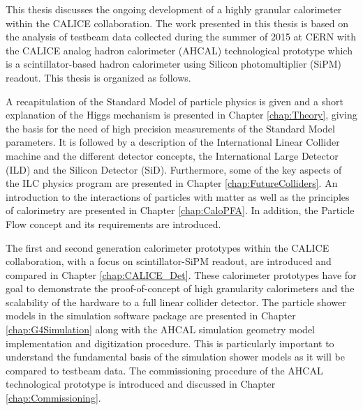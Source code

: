 This thesis discusses the ongoing development of a highly granular calorimeter within the CALICE collaboration. The work presented in this thesis is based on the analysis of testbeam data collected during the summer of 2015 at CERN with the CALICE analog hadron calorimeter (AHCAL) technological prototype which is a scintillator-based hadron calorimeter using Silicon photomultiplier (SiPM) readout. This thesis is organized as follows.

A recapitulation of the Standard Model of particle physics is given and a short explanation of the Higgs mechanism is presented in Chapter \ref{chap:Theory}, giving the basis for the need of high precision measurements of the Standard Model parameters. It is followed by a description of the International Linear Collider machine and the different detector concepts, the International Large Detector (ILD) and the Silicon Detector (SiD). Furthermore, some of the key aspects of the ILC physics program are presented in Chapter \ref{chap:FutureColliders}. An introduction to the interactions of particles with matter as well as the principles of calorimetry are presented in Chapter \ref{chap:CaloPFA}. In addition, the Particle Flow concept and its requirements are introduced.

The first and second generation calorimeter prototypes within the CALICE collaboration, with a focus on scintillator-SiPM readout, are introduced and compared in Chapter \ref{chap:CALICE_Det}. These calorimeter prototypes have for goal to demonstrate the proof-of-concept of high granularity calorimeters and the scalability of the hardware to a full linear collider detector. The particle shower models in the \geant simulation software package are presented in Chapter \ref{chap:G4Simulation} along with the AHCAL simulation geometry model implementation and digitization procedure. This is particularly important to understand the fundamental basis of the simulation shower models as it will be compared to testbeam data. The commissioning procedure of the AHCAL technological prototype is introduced and discussed in Chapter \ref{chap:Commissioning}.


